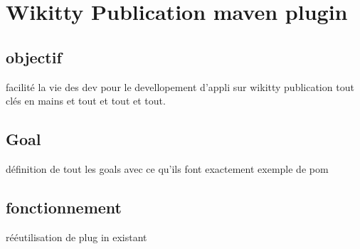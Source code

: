 \section{Wikitty Publication maven plugin}

\subsection{objectif}
facilité la vie des dev pour le devellopement d'appli sur wikitty publication
tout clés en mains 
et tout et tout et tout.


\subsection{Goal}

définition de tout les goals avec ce qu'ils font exactement
exemple de pom

\subsection{fonctionnement}

rééutilisation de plug in existant


